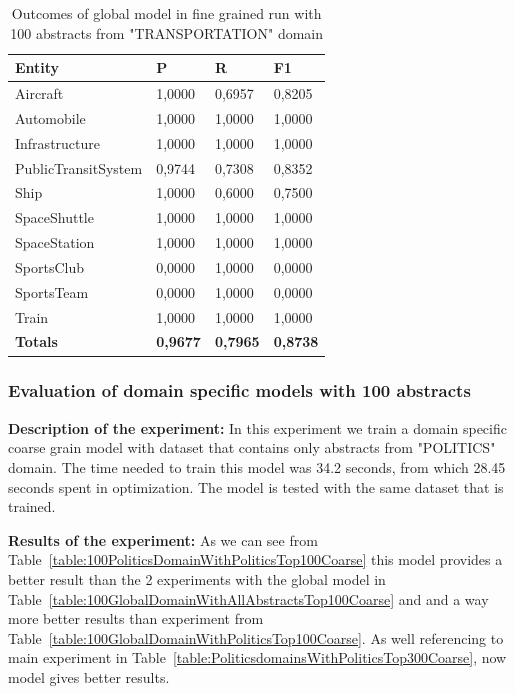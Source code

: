 \documentclass[thesis=M,english]{FITthesis}[2018/05/30]
\begin{document}
	\begin{table}[H]\centering
		\begin{tabular}{|l|l|l|l|}
			\hline {\textbf{Entity}} & {\textbf{P}} & {\textbf{R}} & {\textbf{F1}}\\\hline
				Aircraft & 1,0000 & 0,6957 & 0,8205\\
				Automobile & 1,0000 & 1,0000 & 1,0000\\				
				Infrastructure & 1,0000 & 1,0000 & 1,0000\\
				PublicTransitSystem & 0,9744 & 0,7308 & 0,8352\\
				Ship & 1,0000 & 0,6000 & 0,7500\\				
				SpaceShuttle & 1,0000 & 1,0000 & 1,0000\\
				SpaceStation & 1,0000 & 1,0000 & 1,0000\\
				SportsClub & 0,0000 & 1,0000 & 0,0000\\
				SportsTeam & 0,0000 & 1,0000 & 0,0000\\
				Train & 1,0000 & 1,0000 & 1,0000\\\hline
				\textbf{Totals} & \textbf{0,9677} & \textbf{0,7965} & \textbf{0,8738}\\\hline
		\end{tabular}
		\caption{Outcomes of global model in fine grained run with 100 abstracts from "TRANSPORTATION" domain \label{table:100GlobalDomainWithTransportationTop100Fine}}
	\end{table}		
	

\subsubsection{Evaluation of domain specific models with 100 abstracts}

	\textbf{Description of the experiment:} In this experiment we train a domain specific coarse grain model with dataset that contains only abstracts from "POLITICS" domain. The time needed to train this model was 34.2 seconds, from which 28.45 seconds spent in optimization. The model is tested with the same dataset that is trained.

	\textbf{Results of the experiment:} As we can see from Table~\ref{table:100PoliticsDomainWithPoliticsTop100Coarse} this model provides a better result than the 2 experiments with the global model in Table~\ref{table:100GlobalDomainWithAllAbstractsTop100Coarse} and and a way more better results than experiment from Table~\ref{table:100GlobalDomainWithPoliticsTop100Coarse}. As well referencing to main experiment in Table~\ref{table:PoliticsdomainsWithPoliticsTop300Coarse}, now model gives better results. 
\end{document}
